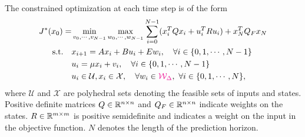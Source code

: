 The constrained optimization at each time step is of the form
\begin{align}
\label{eq:RMPC_prob}
J^{\ast}(x_0)=&\min_{v_0,\cdots,v_{N-1}} \max_{w_0,\cdots,w_{N-1}} \sum_{i=0}^{N-1}(x_i^TQx_i+u_i^TRu_i) + x_N^TQ_Fx_N\nonumber\\
\text{s.t.} \quad &x_{i+1}=Ax_i+Bu_i + E w_i, \quad\forall i\in\{0,1,\cdots,N-1\}\nonumber\\
\quad &u_i=\mu x_i+v_i, \quad\forall i\in\{0,1,\cdots,N-1\}\nonumber\\
&u_i\in\mathcal{U},x_i\in\mathcal{X},\quad \forall w_i\in\textcolor{magenta}{\mathcal{W}_{\Delta}},\,\,\forall i\in\{0,1,\cdots,N\},
\end{align}
%
where $\mathcal U$ and $\mathcal X$ are polyhedral sets denoting the feasible
sets of inputs and states. Positive definite matrices $Q\in\mathbb{R}^{n\times n}$ and
$Q_F\in\mathbb{R}^{n\times n}$ indicate weights on the states. $R\in\mathbb{R}^{m\times m}$ is
positive semidefinite and indicates a weight on the input in the objective function. $N$ denotes the length of the prediction horizon.

